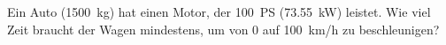 
\begin{aufgabe}
	Ein Auto (\SI{1500}{kg}) hat einen Motor, der \SI{100}{PS} (\SI{73.55}{kW}) leistet.
	Wie viel Zeit braucht der Wagen mindestens, um von 0 auf \SI{100}{km/h} zu beschleunigen?
\end{aufgabe}

